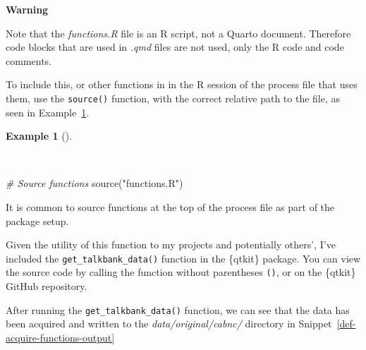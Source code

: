\documentclass[
  letterpaper,
  krantz1]{latex/krantz-mod}
\newenvironment{Shaded}{\begin{snugshade}}{\end{snugshade}}
\newcommand{\CommentTok}[1]{\textcolor[rgb]{0.00,0.00,0.00}{\textit{#1}}}
\newcommand{\FunctionTok}[1]{\textcolor[rgb]{0.00,0.00,0.00}{#1}}
\newcommand{\NormalTok}[1]{\textcolor[rgb]{0.00,0.00,0.00}{#1}}
\newcommand{\StringTok}[1]{\textcolor[rgb]{0.00,0.00,0.00}{#1}}
\theoremstyle{definition}
\newtheorem{example}{Example}[chapter]
\theoremstyle{definition}
\theoremstyle{remark}
\begin{document}
\begin{tcolorbox}[enhanced jigsaw, leftrule=.75mm, colframe=quarto-callout-color-frame, left=2mm, colback=white, toprule=.15mm, breakable, arc=.35mm, opacityback=0, bottomrule=.15mm, rightrule=.15mm]

\textbf{ Warning}

Note that the \emph{functions.R} file is an R script, not a Quarto
document. Therefore code blocks that are used in \emph{.qmd} files are
not used, only the R code and code comments.

\end{tcolorbox}

To include this, or other functions in in the R session of the process
file that uses them, use the \texttt{source()} function, with the
correct relative path to the file, as seen in
Example~\ref{exm-acquire-source-functions}.

\begin{example}[]\protect\hypertarget{exm-acquire-source-functions}{}\label{exm-acquire-source-functions}

~

\begin{Shaded}
\begin{Highlighting}[numbers=left,,]
\CommentTok{\# Source functions}
\FunctionTok{source}\NormalTok{(}\StringTok{"functions.R"}\NormalTok{)}
\end{Highlighting}
\end{Shaded}

\end{example}

It is common to source functions at the top of the process file as part
of the package setup.

Given the utility of this function to my projects and potentially
others', I've included the \texttt{get\_talkbank\_data()} function in
the \{qtkit\} package. You can view the source code by calling the
function without parentheses \texttt{()}, or on the \{qtkit\} GitHub
repository.

After running the \texttt{get\_talkbank\_data()} function, we can see
that the data has been acquired and written to the
\emph{data/original/cabnc/} directory in
Snippet~\ref{def-acquire-functions-output}
\end{document}
